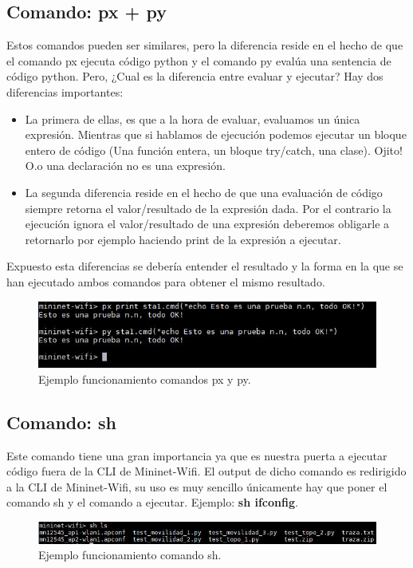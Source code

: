 \subsection{Comando: px + py}
Estos comandos pueden ser similares, pero la diferencia reside en el hecho de que el comando px ejecuta código python y el comando py evalúa una sentencia de código python. Pero, ¿Cual es la diferencia entre evaluar y ejecutar? Hay dos diferencias importantes:
\begin{itemize}
    \item La primera de ellas, es que a la hora de evaluar, evaluamos un única expresión. Mientras que si hablamos de ejecución podemos ejecutar un bloque entero de código (Una función entera, un bloque try/catch, una clase). Ojito! O.o una declaración no es una expresión.
    \item La segunda diferencia reside en el hecho de que una evaluación de código siempre retorna el valor/resultado de la expresión dada. Por el contrario la ejecución ignora el valor/resultado de una expresión deberemos obligarle a retornarlo por ejemplo haciendo print de la expresión a ejecutar.  
\end{itemize}
Expuesto esta diferencias se debería entender el resultado y la forma en la que se han ejecutado ambos comandos para obtener el mismo resultado.\newline
\newline
\begin{figure}[!htb]
  \centering
    \includegraphics[width=\linewidth]{./img/cli/8.JPG}
    \caption{Ejemplo funcionamiento comandos px y py.}
  \label{fig:yo}
\end{figure}
\subsection{Comando: sh}
Este comando tiene una gran importancia ya que es nuestra puerta a ejecutar código fuera de la CLI de Mininet-Wifi. El output de dicho comando es redirigido a la CLI de Mininet-Wifi, su uso es muy sencillo únicamente hay que poner el comando sh y el comando a ejecutar. Ejemplo: \textbf{sh ifconfig}.
\begin{figure}[!htb]
  \centering
    \includegraphics[width=\linewidth]{./img/cli/9.JPG}
    \caption{Ejemplo funcionamiento comando sh.}
  \label{fig:yo}
\end{figure}
\newpage
